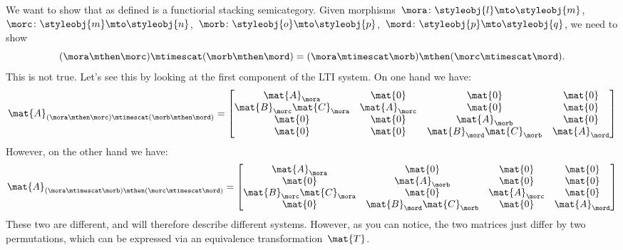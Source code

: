 \begin{example}
    We want to show that \LTI as defined is a functiorial stacking semicategory.
    Given morphisms~$\mora\colon \styleobj{l}\mto \styleobj{m}$,~$\morc\colon \styleobj{m}\mto \styleobj{n}$,~$\morb\colon \styleobj{o}\mto \styleobj{p}$,~$\mord\colon \styleobj{p}\mto \styleobj{q}$, we need to show
    \begin{equation*}
        (\mora \mthen \morc)\mtimescat (\morb\mthen \mord)=(\mora\mtimescat \morb)\mthen (\morc\mtimescat \mord).
    \end{equation*}
    This is not true.
    Let's see this by looking at the first component of the LTI system.
    On one hand we have:
    \begin{equation*}
        \mat{A}_{(\mora \mthen \morc)\mtimescat (\morb\mthen \mord)}=
        \begin{bmatrix}
            \mat{A}_\mora              & \mat{0}       & \mat{0}                    & \mat{0}       \\
            \mat{B}_\morc\mat{C}_\mora & \mat{A}_\morc & \mat{0}                    & \mat{0}       \\
            \mat{0}                    & \mat{0}       & \mat{A}_\morb              & \mat{0}       \\
            \mat{0}                    & \mat{0}       & \mat{B}_\mord\mat{C}_\morb & \mat{A}_\mord
        \end{bmatrix}
    \end{equation*}
    However, on the other hand we have:
    \begin{equation*}
        \mat{A}_{(\mora\mtimescat \morb)\mthen (\morc\mtimescat \mord)}=
        \begin{bmatrix}
            \mat{A}_\mora               & \mat{0}                     & \mat{0}       & \mat{0}       \\
            \mat{0}                     & \mat{A}_\morb               & \mat{0}       & \mat{0}       \\
            \mat{B}_\morc \mat{C}_\mora & \mat{0}                     & \mat{A}_\morc & \mat{0}       \\
            \mat{0}                     & \mat{B}_\mord \mat{C}_\morb & \mat{0}       & \mat{A}_\mord
        \end{bmatrix}
    \end{equation*}
    These two are different, and will therefore describe different systems.
    However, as you can notice, the two matrices just differ by two permutations, which can be expressed via an equivalence transformation~$\mat{T}$.

\end{example}
